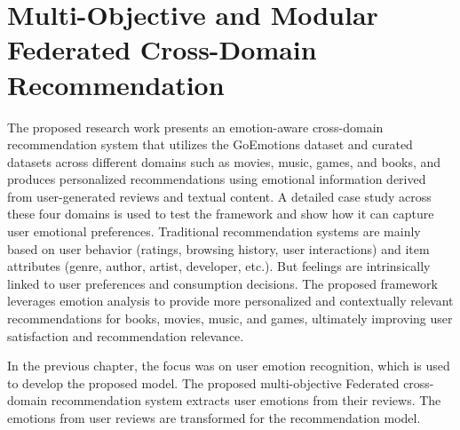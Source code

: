 \chapter{Multi-Objective and Modular Federated Cross-Domain Recommendation}
The proposed research work presents an emotion-aware cross-domain recommendation system that utilizes the GoEmotions dataset and curated datasets across different domains such as movies, music, games, and books, and produces personalized recommendations using emotional information derived from user-generated reviews and textual content. A detailed case study across these four domains is used to test the framework and show how it can capture user emotional preferences. Traditional recommendation systems are mainly based on user behavior (ratings, browsing history, user interactions) and item attributes (genre, author, artist, developer, etc.). But feelings are intrinsically linked to user preferences and consumption decisions. The proposed framework leverages emotion analysis to provide more personalized and contextually relevant recommendations for books, movies, music, and games, ultimately improving user satisfaction and recommendation relevance.

In the previous chapter, the focus was on user emotion recognition, which is used to develop the proposed model. The proposed multi-objective Federated cross-domain recommendation system extracts user emotions from their reviews. The emotions from user reviews are transformed for the recommendation model.

